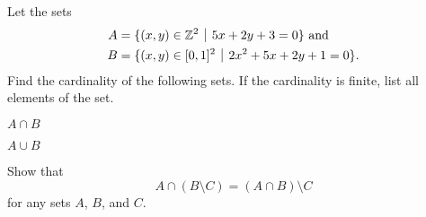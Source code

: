 \begin{problem}
    Let the sets
    \begin{align*}
        A &= \{(x,y) \in \Z^2 \vert 5x+2y+3=0\} \text{ and}\\
        B &= \{(x,y) \in [0,1]^2 \vert 2x^2+5x+2y+1=0\}.
    \end{align*}
    Find the cardinality of the following sets. If the cardinality is finite, list all elements of the set.
    \begin{partquestions}{\alph*}
        \item $A \cap B$
        \item $A \cup B$
    \end{partquestions}
\end{problem}

\begin{problem}
    Show that
    \[
        A \cap (B \setminus C) = (A \cap B) \setminus C
    \]
    for any sets $A$, $B$, and $C$.
\end{problem}
